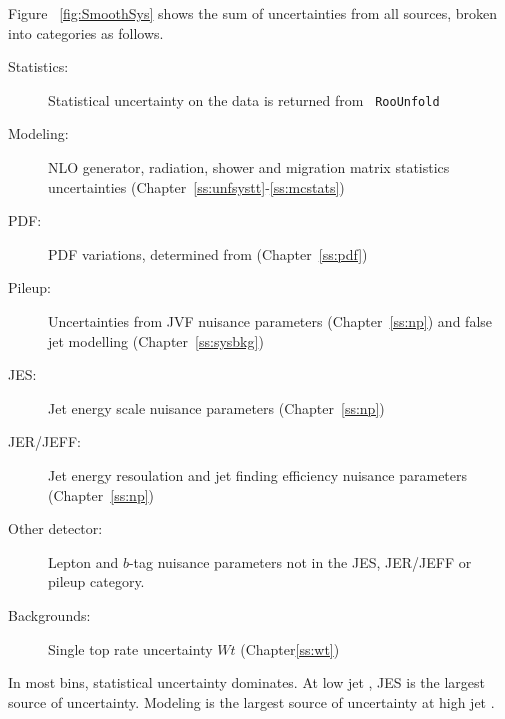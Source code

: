 Figure ~\ref{fig:SmoothSys} shows the sum of uncertainties from all sources, broken into categories as follows.
\begin{description}
\item[Statistics:] Statistical uncertainty on the data is returned from \texttt{ RooUnfold}
\item[Modeling:] NLO generator, radiation, shower and migration matrix statistics uncertainties (Chapter~\ref{ss:unfsystt}-\ref{ss:mcstats})
\item[PDF:] PDF variations, determined from \mcnlohw (Chapter~\ref{ss:pdf})
\item[Pileup:] Uncertainties from JVF nuisance parameters (Chapter~\ref{ss:np}) and false jet modelling (Chapter~\ref{ss:sysbkg})
\item[JES:] Jet energy scale nuisance parameters (Chapter~\ref{ss:np})
\item[JER/JEFF:] Jet energy resoulation and jet finding efficiency nuisance parameters (Chapter~\ref{ss:np})
\item[Other detector:] Lepton and $b$-tag nuisance parameters not in the JES, JER/JEFF or pileup category.
\item[Backgrounds:] Single top rate uncertainty $Wt$ (Chapter\ref{ss:wt}) 
\end{description}

In most bins, statistical uncertainty dominates. At low jet \pt, JES is the largest source of uncertainty. Modeling is the largest source of uncertainty at high jet \pt.




